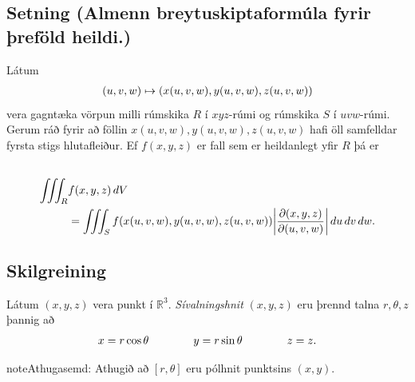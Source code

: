 \documentclass[a4paper,10pt,icelandic]{sphinxmanual}
\begin{document}
\subsection{Setning (Almenn breytuskiptaformúla fyrir þreföld heildi.)}
\label{Kafli4:setning-almenn-breytuskiptaformula-fyrir-refold-heildi}
Látum
\begin{gather}
\begin{split}\displaystyle (u,v,w)\mapsto (x(u,v,w), y(u,v,w), z(u,v,w))\end{split}\notag
\end{gather}
vera gagntæka vörpun milli rúmskika \(R\) í \(xyz\)-rúmi og
rúmskika \(S\) í \(uvw\)-rúmi. Gerum ráð fyrir að föllin
\(x(u,v,w), y(u,v,w), z(u,v,w)\) hafi öll samfelldar fyrsta stigs
hlutafleiður. Ef \(f(x,y,z)\) er fall sem er heildanlegt yfir
\(R\) þá er
\begin{gather}
\begin{split}\displaystyle\end{split}\notag\\\begin{split}\begin{aligned}
\int\!\!\!\int\!\!\!\int_R& f(x,y,z)\,dV \\&=\int\!\!\!\int\!\!\!\int_S f(x(u,v,w), y(u,v,w), z(u,v,w))
\bigg|\frac{\partial(x,y,z)}{\partial(u,v,w)}\bigg|\,du\,dv\,dw.\end{aligned}\end{split}\notag
\end{gather}

\subsection{Skilgreining}
\label{Kafli4:id18}
Látum \((x,y,z)\) vera punkt í \({\mathbb  R}^3\).
\emph{Sívalningshnit} \((x,y,z)\) eru þrennd talna \(r, \theta, z\)
þannig að
\begin{gather}
\begin{split}\displaystyle x=r\cos\theta\qquad\qquad y=r\sin\theta\qquad\qquad z=z.\end{split}\notag
\end{gather}
\begin{notice}{note}{Athugasemd:}
Athugið að \([r,\theta]\) eru pólhnit punktsins \((x,y)\).
\end{notice}
\end{document}
